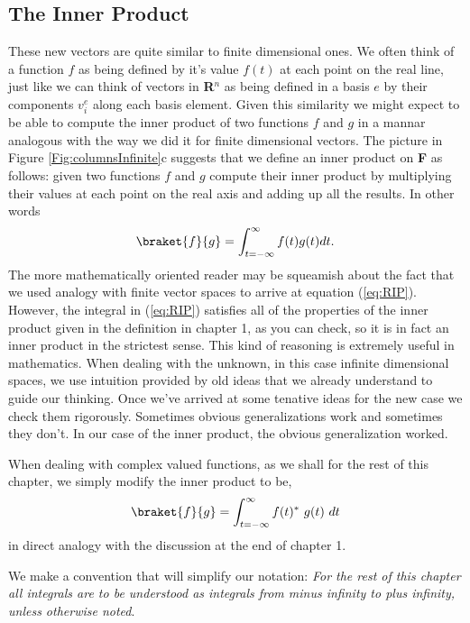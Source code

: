 \subsection{The Inner Product}
These new vectors are quite similar to finite dimensional ones.  We often think of a function $f$ as being defined by it's value $f(t)$ at each point on the real line, just like we can think of vectors in \textbf{R}$^n$ as being defined in a basis $e$ by their components $v^e_i$ along each basis element.  Given this similarity we might expect to be able to compute the inner product of two functions $f$ and $g$ in a mannar analogous with the way we did it for finite dimensional vectors.  The picture in Figure \ref{Fig:columnsInfinite}c suggests that we define an inner product on \textbf{F} as follows: given two functions $f$ and $g$ compute their inner product by multiplying their values at each point on the real axis and adding up all the results.  In other words
\begin{equation}\label{eq:RIP} \braket{f}{g} = \int_{t=-\infty}^{\infty} f(t)g(t) dt. \end{equation}
The more mathematically oriented reader may be squeamish about the fact that we used analogy with finite vector spaces to arrive at equation (\ref{eq:RIP}).  However, the integral in (\ref{eq:RIP}) satisfies all of the properties of the inner product given in the definition in chapter 1, as you can check, so it is in fact an inner product in the strictest sense.  This kind of reasoning is extremely useful in mathematics.  When dealing with the unknown, in this case infinite dimensional spaces, we use intuition provided by old ideas that we already understand to guide our thinking.  Once we've arrived at some tenative ideas for the new case we check them rigorously.  Sometimes obvious generalizations work and sometimes they don't.  In our case of the inner product, the obvious generalization worked.

When dealing with complex valued functions, as we shall for the rest of this chapter, we simply modify the inner product to be,
\begin{displaymath} \braket{f}{g} = \int_{t=-\infty}^{\infty} f(t)^*~g(t)~dt \end{displaymath}
in direct analogy with the discussion at the end of chapter 1.

We make a convention that will simplify our notation: \emph{For the rest of this chapter all integrals are to be understood as integrals from minus infinity to plus infinity, unless otherwise noted}.

